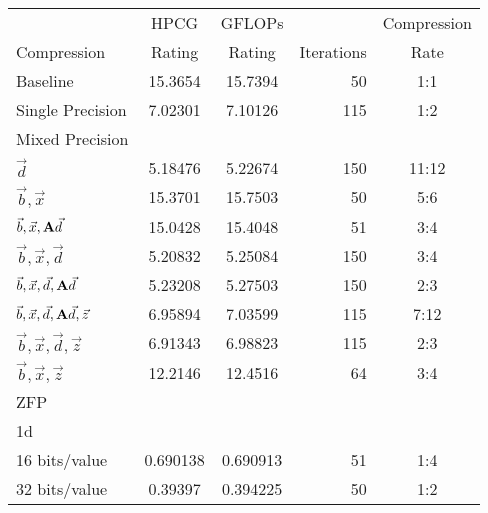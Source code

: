 \begin{table}
	\centering
	\begin{tabular}{l|S[table-format=2.6]|S[table-format=2.6]|r|c}
		            & {HPCG}   & {GFLOPs} &            & Compression \\
		Compression & {Rating} & {Rating} & Iterations & Rate \\
		\hline
		Baseline & 15.3654 & 15.7394 & 50 & 1:1 \\ %
		Single Precision & 7.02301 & 7.10126 & 115 & 1:2 \\
		Mixed Precision & & & & \\ %
		\hspace{3mm} \(\vec{d}\) & 5.18476 & 5.22674 & 150 & 11:12 \\
		\hspace{3mm} \(\vec{b}, \vec{x}\) & 15.3701 & 15.7503 & 50 & 5:6 \\
		\hspace{3mm} \(\vec{b}, \vec{x}, \mathbf{A}\vec{d}\) & 15.0428 & 15.4048 & 51 & 3:4 \\
		\hspace{3mm} \(\vec{b}, \vec{x}, \vec{d}\) & 5.20832 & 5.25084 & 150 & 3:4 \\ %
		\hspace{3mm} \(\vec{b}, \vec{x}, \vec{d}, \mathbf{A}\vec{d}\) & 5.23208 & 5.27503 & 150 & 2:3 \\
		\hspace{3mm} \(\vec{b}, \vec{x}, \vec{d}, \mathbf{A}\vec{d}, \vec{z}\) & 6.95894 & 7.03599 & 115 & 7:12 \\
		\hspace{3mm} \(\vec{b}, \vec{x}, \vec{d}, \vec{z}\) & 6.91343 & 6.98823 & 115 & 2:3 \\
		\hspace{3mm} \(\vec{b}, \vec{x}, \vec{z}\) & 12.2146 & 12.4516 & 64 & 3:4 \\
		ZFP & & & & \\
		\hspace{3mm} 1d & & & & \\
			\hspace{6mm} 16 bits/value & 0.690138 & 0.690913 & 51 & 1:4 \\
			\hspace{6mm} 32 bits/value & 0.39397 & 0.394225 & 50 & 1:2 \\

\end{tabular}
\end{table}
